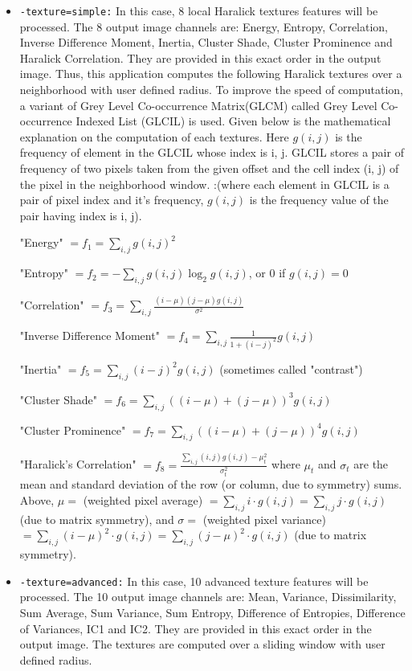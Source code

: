 \begin{itemize}
\item \verb?-texture=simple:?
In this case, 8 local Haralick textures features will be processed.
The 8 output image channels are: Energy, Entropy, Correlation, Inverse Difference
Moment, Inertia, Cluster Shade, Cluster Prominence and Haralick Correlation. They
are provided in this exact order in the output image. Thus, this application
computes the following Haralick textures over a neighborhood with user defined
radius. 
To improve the speed of computation, a variant of Grey Level Co-occurrence Matrix(GLCM) 
called Grey Level Co-occurrence Indexed List (GLCIL) is used.
Given below is the mathematical explanation on the computation of each textures. 
Here $ g(i, j) $ is the frequency of element in the GLCIL whose index is i, j.
GLCIL stores a pair of frequency of two pixels taken from the given offset and the cell index (i, j) of the pixel in the neighborhood window.
:(where each element in GLCIL is a pair of pixel index and it's frequency,
 $ g(i, j) $ is the frequency value of the pair having index is i, j).

"Energy" $ = f_1 = \sum_{i, j}g(i, j)^2 $

"Entropy" $ = f_2 = -\sum_{i, j}g(i, j) \log_2 g(i, j)$, or 0 if $g(i, j) = 0$

"Correlation" $ = f_3 = \sum_{i, j}\frac{(i - \mu)(j - \mu)g(i, j)}{\sigma^2} $

"Inverse Difference Moment" $= f_4 = \sum_{i, j}\frac{1}{1 + (i - j)^2}g(i, j) $

"Inertia" $ = f_5 = \sum_{i, j}(i - j)^2g(i, j) $ (sometimes called "contrast")

"Cluster Shade" $ = f_6 = \sum_{i, j}((i - \mu) + (j - \mu))^3 g(i, j) $

"Cluster Prominence" $ = f_7 = \sum_{i, j}((i - \mu) + (j - \mu))^4 g(i, j) $

"Haralick's Correlation" $ = f_8 = \frac{\sum_{i, j}(i, j) g(i, j) -\mu_t^2}{\sigma_t^2} $
where $\mu_t$ and $\sigma_t$ are the mean and standard deviation of the row (or column, due to symmetry) sums. Above, 
$ \mu = $ (weighted pixel average) $ = \sum_{i, j}i \cdot g(i, j) = \sum_{i, j}j \cdot g(i, j) $ (due to matrix symmetry), and 
$ \sigma = $ (weighted pixel variance) $ = \sum_{i, j}(i - \mu)^2 \cdot g(i, j) = \sum_{i, j}(j - \mu)^2 \cdot g(i, j) $ (due to matrix symmetry).

\item \verb?-texture=advanced:?
In this case, 10 advanced texture features will be processed. 
The 10 output image channels are: Mean, Variance, Dissimilarity, Sum Average, 
Sum Variance, Sum Entropy, Difference of Entropies, Difference of Variances, IC1 and IC2. 
They are provided in this exact order in the output image. 
The textures are computed over a sliding window with user defined radius.


\end{itemize}
